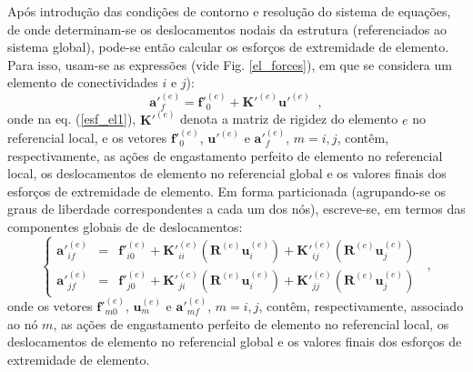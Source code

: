Após introdução das condições de contorno e resolução do sistema de equações, de onde determinam-se os deslocamentos nodais da estrutura (referenciados ao sistema global), pode-se então calcular os esforços de extremidade de elemento. Para isso, usam-se as expressões (vide Fig. \ref{el_forces}), em que se considera um elemento de conectividades \(i\) e \(j\)):
\begin{equation} \label{esf_el1}
	{\mathbf{a'}}^{(e)}_{f}={\mathbf{f'}}^{(e)}_{0}+ {\mathbf{K'}}^{(e)}{\mathbf{u'}}^{(e)} \;\;,
\end{equation}
\noindent onde na eq. (\ref{esf_el1}), \({\mathbf{K'}}^{(e)}\) denota a matriz de rigidez do elemento \(e\) no referencial local, e os vetores \({\mathbf{f'}}^{(e)}_{0}\), \({\mathbf{u'}}^{(e)}\) e \({\mathbf{a'}}^{(e)}_f\), \(m\!=\!i,j\), contêm, respectivamente, as ações de engastamento perfeito de elemento no referencial local, os deslocamentos de elemento no referencial global e os valores finais dos esforços de extremidade de elemento. Em forma particionada (agrupando-se os graus de liberdade correspondentes a cada um dos nós), escreve-se, em termos das componentes globais de de deslocamentos:
\begin{equation} \label{esf_el2}
	\left\{ \begin{array}{rcl}
	{\mathbf{a'}}^{(e)}_{if} \!\!\!                      & = & \!\!\!
	                                        {\mathbf{f'}}^{(e)}_{i0}+ {\mathbf{K'}}^{(e)}_{ii} \left(\mathbf{R}^{(e)} \mathbf{u}^{(e)}_{i}\right) +{\mathbf{K'}}^{(e)}_{ij}\left(\mathbf{R}^{(e)} \mathbf{u}^{(e)}_{j}\right)                                                              \\
	                                        {\mathbf{a'}}^{(e)}_{jf} \!\!\! & = & \!\!\!  {\mathbf{f'}}^{(e)}_{j0} +
	                                                                                  {\mathbf{K'}}^{(e)}_{ji}\left(\mathbf{R}^{(e)} \mathbf{u}^{(e)}_{i}\right) + {\mathbf{K'}}^{(e)}_{jj}\left(\mathbf{R}^{(e)} \mathbf{u}^{(e)}_{j}\right)
	\end{array}  \right. \;\; ,
\end{equation}
\noindent onde os vetores \({\mathbf{f'}}^{(e)}_{m0}\), \(\mathbf{u}^{(e)}_{m}\) e \({\mathbf{a'}}^{(e)}_{mf}\), \(m\!=\!i,j\), contêm, respectivamente, associado ao nó \(m\), as ações de engastamento perfeito de elemento no referencial local, os deslocamentos de elemento no referencial global e os valores finais dos esforços de extremidade de elemento.
